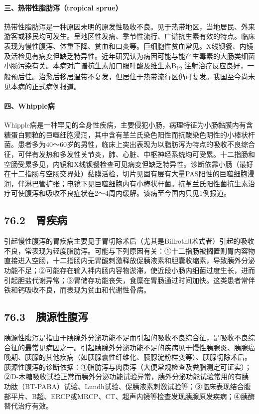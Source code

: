 \paragraph{三、热带性脂肪泻（tropical sprue）}

热带性脂肪泻是一种原因未明的原发性吸收不良。见于热带地区，当地居民、外来游客或移民均可发生。呈地区性发病、季节性流行、广谱抗生素有效的特点。临床表现为慢性腹泻、体重下降、贫血和口炎等。巨细胞性贫血常见。X线钡餐、内镜及活检见有病变但缺乏特异性。近年研究认为病因可能与能产生毒素的大肠类细菌小肠污染有关。本病对广谱抗生素加口服叶酸及维生素B\textsubscript{12}
注射治疗反应良好，一般预后佳。治愈后移居温带不复发，但居住于热带流行区仍可复发。我国至今尚未见本病的正式病例报道。

\paragraph{四、Whipple病}

Whipple病是一种罕见的全身性疾病，主要侵犯小肠，病理特征为小肠黏膜内有含糖蛋白颗粒的巨噬细胞浸润，其中含有革兰氏染色阳性而抗酸染色阴性的小棒状杆菌。患者多为40～60岁的男性，临床上突出表现为以脂肪泻为特点的吸收不良综合征，可伴有发热和多发性关节炎，肺、心脏、中枢神经系统均可受累。十二指肠和空肠受累多见，内镜和X线钡餐检查可见病变但缺乏特异性。诊断依靠小肠（最好在十二指肠与空肠交界处）黏膜活检，切片见固有层有大量PAS阳性的巨噬细胞浸润，伴淋巴管扩张；电镜下见巨噬细胞内有小棒状杆菌。抗革兰氏阳性菌抗生素治疗可使腹泻和吸收不良症状在2～4周内缓解。该病至今国内只见1例报道。

\subsection{76.2　胃疾病}

引起慢性腹泻的胃疾病主要见于胃切除术后（尤其是BillrothⅡ术式者）引起的吸收不良，常表现为轻度脂肪泻。可能与下列原因有关：①十二指肠被搁置则胃内容物直接进入空肠，十二指肠内无胃酸刺激释放促胰液素和胆囊收缩素，导致胰外分泌功能不足；②可能存在输入袢内肠内容物淤滞，使近段小肠内细菌过度生长，进而引起胆盐代谢异常；③胃储存功能丧失，食糜在胃肠通过时间加快。这类患者常伴铁和钙吸收不良，而表现为贫血和代谢性骨病。

\subsection{76.3　胰源性腹泻}

胰源性腹泻是指由于胰腺外分泌功能不足而引起的吸收不良综合征，是吸收不良综合征的最常见病因之一。引起胰腺外分泌功能不足的疾病见于慢性胰腺炎、胰腺癌晚期、胰腺的其他疾病（如胰腺囊性纤维化、胰腺淀粉样变等）、胰腺切除术后。胰源性腹泻的诊断依据：①脂肪泻与肉质泻（大便常规检查及粪脂测定可证实）；②D-木糖吸收试验正常而胰外分泌功能试验异常，胰外分泌功能试验常用的有胰功肽（BT-PABA）试验、Lundh试验、促胰液素刺激试验等；③临床表现结合腹部平片、B超、ERCP或MRCP、CT、超声内镜等检查发现胰腺原发疾病；④胰酶替代治疗有效。

